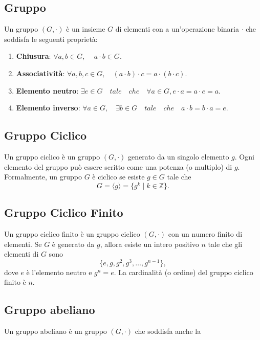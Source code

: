 \documentclass[a4paper,12pt]{report}
\begin{document}
\subsection*{Gruppo}

Un gruppo \( (G, \cdot) \) è un insieme \( G \) di elementi con a un'operazione binaria \( \cdot \) che soddisfa le seguenti proprietà:

\begin{enumerate}
    \item \textbf{Chiusura}: \(\forall a, b \in G, \, \quad a \cdot b \in G.\)
    \item \textbf{Associatività}: \(\forall a, b, c \in G, \quad (a \cdot b) \cdot c = a \cdot (b \cdot c).\)
    \item \textbf{Elemento neutro}: \(\exists e \in G \quad tale \quad che \quad \forall a \in G, e \cdot a = a \cdot e = a.\)
    \item \textbf{Elemento inverso}: \(\forall a \in G, \quad \exists b \in G \quad tale \quad che \quad a \cdot b = b \cdot a = e.\)
\end{enumerate}

\subsection*{Gruppo Ciclico}

Un gruppo ciclico è un gruppo \( (G, \cdot) \) generato da un singolo elemento \( g \). Ogni elemento del gruppo può essere scritto come una potenza (o multiplo) di \( g \). Formalmente, un gruppo \( G \) è ciclico se esiste \( g \in G \) tale che
\[G = \langle g \rangle = \{ g^k \mid k \in \mathbb{Z} \}.\]

\subsection*{Gruppo Ciclico Finito}

Un gruppo ciclico finito è un gruppo ciclico \( (G, \cdot) \) con un numero finito di elementi. Se \( G \) è generato da \( g \), allora esiste un intero positivo \( n \) tale che gli elementi di \( G \) sono
\[\{e, g, g^2, g^3, \ldots, g^{n-1}\},\]
dove \( e \) è l'elemento neutro e \( g^n = e \). La cardinalità (o ordine) del gruppo ciclico finito è \( n \).

\subsection*{Gruppo abeliano}
Un gruppo abeliano è un gruppo \( (G, \cdot) \) che soddisfa anche la 
\end{document}

